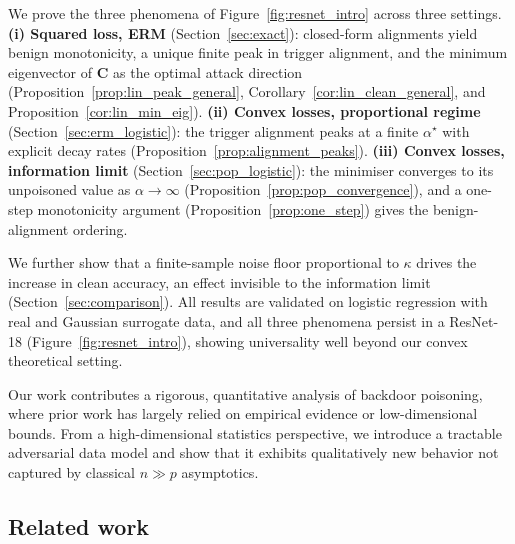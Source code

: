 \documentclass[11pt]{article}
\newcommand{\C}{\mathbf{C}}
\begin{document}
We prove the three phenomena of Figure~\ref{fig:resnet_intro} across three settings. \textbf{(i) Squared loss, ERM} (Section~\ref{sec:exact}): closed-form alignments yield benign monotonicity, a unique finite peak in trigger alignment, and the minimum eigenvector of $\C$ as the optimal attack direction (Proposition~\ref{prop:lin_peak_general}, Corollary~\ref{cor:lin_clean_general}, and Proposition~\ref{cor:lin_min_eig}). \textbf{(ii) Convex losses, proportional regime} (Section~\ref{sec:erm_logistic}): the trigger alignment peaks at a finite $\alpha^\star$ with explicit decay rates (Proposition~\ref{prop:alignment_peaks}). \textbf{(iii) Convex losses, information limit} (Section~\ref{sec:pop_logistic}): the minimiser converges to its unpoisoned value as $\alpha \to \infty$ (Proposition~\ref{prop:pop_convergence}), and a one-step monotonicity argument (Proposition~\ref{prop:one_step}) gives the benign-alignment ordering.

We further show that a finite-sample noise floor proportional to $\kappa$ drives the increase in clean accuracy, an effect invisible to the information limit (Section~\ref{sec:comparison}).
All results are validated on logistic regression with real and Gaussian surrogate data, and all three phenomena persist in a ResNet-18 (Figure~\ref{fig:resnet_intro}), showing universality well beyond our convex theoretical setting.

Our work contributes a rigorous, quantitative analysis of backdoor poisoning, where prior work has largely relied on empirical evidence or low-dimensional bounds. From a high-dimensional statistics perspective, we introduce a tractable adversarial data model and show that it exhibits qualitatively new behavior not captured by classical $n \gg p$ asymptotics.

\subsection{Related work}
\end{document}
